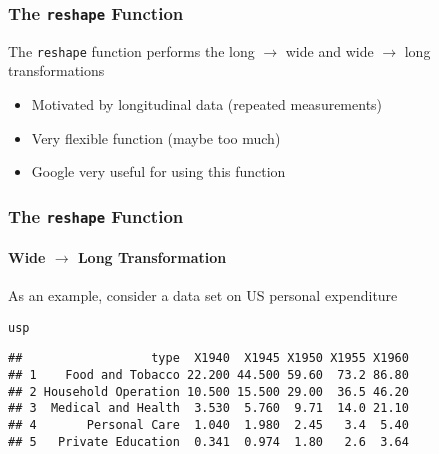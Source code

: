 \documentclass[paper=screen,mathserif]{beamer}\usepackage[]{graphicx}\usepackage[]{color}
\makeatletter
\newcommand{\hlstd}[1]{\textcolor[rgb]{0.345,0.345,0.345}{#1}}%
\newenvironment{kframe}{%
 \def\at@end@of@kframe{}%
 \ifinner\ifhmode%
  \def\at@end@of@kframe{\end{minipage}}%
  \begin{minipage}{\columnwidth}%
 \fi\fi%
 \def\FrameCommand##1{\hskip\@totalleftmargin \hskip-\fboxsep
 \colorbox{shadecolor}{##1}\hskip-\fboxsep
     \hskip-\linewidth \hskip-\@totalleftmargin \hskip\columnwidth}%
 \MakeFramed {\advance\hsize-\width
   \@totalleftmargin\z@ \linewidth\hsize
   \@setminipage}}%
 {\par\unskip\endMakeFramed%
 \at@end@of@kframe}
\newenvironment{knitrout}{}{} %
\newcommand{\ft}[1]{\frametitle{#1}}
\newcommand{\fst}[1]{\framesubtitle{#1}}
\makeatother
\begin{document}
\begin{frame}[fragile]
  \ft{The {\tt reshape} Function}
  
  The \verb=reshape= function performs the long $\rightarrow$ wide and
  wide $\rightarrow$ long transformations
  \begin{itemize}
  \item Motivated by longitudinal data (repeated measurements) 
  \item Very flexible function (maybe too much)
  \item {\color{gray} Google very useful for using this function} 
  \end{itemize}
\end{frame}

\begin{frame}[fragile]
  \ft{The {\tt reshape} Function}
  \fst{Wide $\rightarrow$ Long Transformation}
  


As an example, consider a data set on US personal expenditure
\begin{knitrout}\scriptsize
{}\color{fgcolor}\begin{kframe}
\begin{alltt}
\hlstd{usp}
\end{alltt}
\begin{verbatim}
##                  type  X1940  X1945 X1950 X1955 X1960
## 1    Food and Tobacco 22.200 44.500 59.60  73.2 86.80
## 2 Household Operation 10.500 15.500 29.00  36.5 46.20
## 3  Medical and Health  3.530  5.760  9.71  14.0 21.10
## 4       Personal Care  1.040  1.980  2.45   3.4  5.40
## 5   Private Education  0.341  0.974  1.80   2.6  3.64
\end{verbatim}
\end{kframe}
\end{knitrout}
 
\end{frame}
\end{document}
